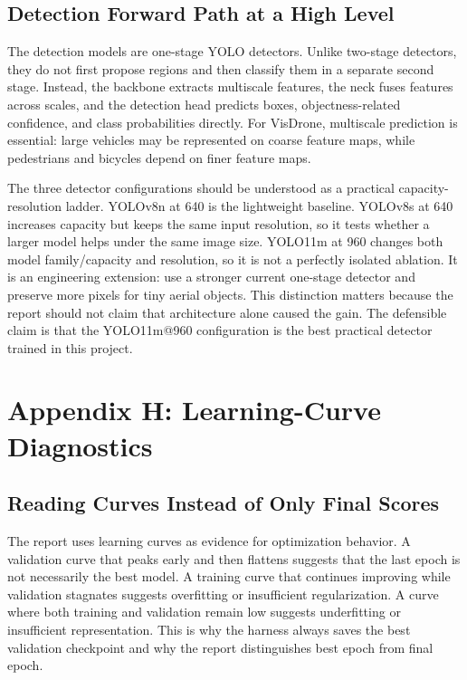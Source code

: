 \documentclass[10pt,twocolumn]{article}
\begin{document}
\subsection{Detection Forward Path at a High Level}

The detection models are one-stage YOLO detectors. Unlike two-stage detectors, they do not first propose regions and then classify them in a separate second stage. Instead, the backbone extracts multiscale features, the neck fuses features across scales, and the detection head predicts boxes, objectness-related confidence, and class probabilities directly. For VisDrone, multiscale prediction is essential: large vehicles may be represented on coarse feature maps, while pedestrians and bicycles depend on finer feature maps.

The three detector configurations should be understood as a practical capacity-resolution ladder. YOLOv8n at 640 is the lightweight baseline. YOLOv8s at 640 increases capacity but keeps the same input resolution, so it tests whether a larger model helps under the same image size. YOLO11m at 960 changes both model family/capacity and resolution, so it is not a perfectly isolated ablation. It is an engineering extension: use a stronger current one-stage detector and preserve more pixels for tiny aerial objects. This distinction matters because the report should not claim that architecture alone caused the gain. The defensible claim is that the YOLO11m@960 configuration is the best practical detector trained in this project.

\section{Appendix H: Learning-Curve Diagnostics}

\subsection{Reading Curves Instead of Only Final Scores}

The report uses learning curves as evidence for optimization behavior. A validation curve that peaks early and then flattens suggests that the last epoch is not necessarily the best model. A training curve that continues improving while validation stagnates suggests overfitting or insufficient regularization. A curve where both training and validation remain low suggests underfitting or insufficient representation. This is why the harness always saves the best validation checkpoint and why the report distinguishes best epoch from final epoch.
\end{document}
